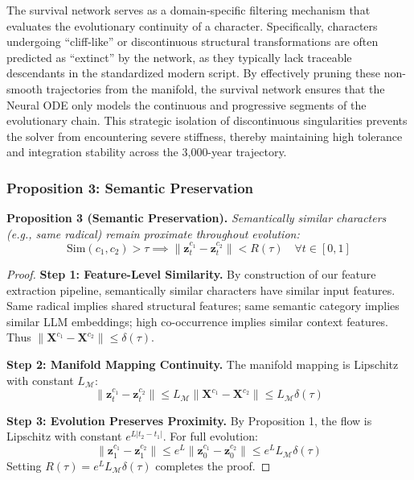 \documentclass{article}
\begin{document}
The survival network serves as a domain-specific filtering mechanism that evaluates the evolutionary continuity of a character. Specifically, characters undergoing ``cliff-like'' or discontinuous structural transformations are often predicted as ``extinct'' by the network, as they typically lack traceable descendants in the standardized modern script. By effectively pruning these non-smooth trajectories from the manifold, the survival network ensures that the Neural ODE only models the continuous and progressive segments of the evolutionary chain. This strategic isolation of discontinuous singularities prevents the solver from encountering severe stiffness, thereby maintaining high tolerance and integration stability across the 3,000-year trajectory.




\subsubsection{Proposition 3: Semantic Preservation}

\textbf{Proposition 3 (Semantic Preservation).} \textit{Semantically similar characters (e.g., same radical) remain proximate throughout evolution:}
\begin{equation}
\text{Sim}(c_1, c_2) > \tau \implies \|\mathbf{z}_t^{c_1} - \mathbf{z}_t^{c_2}\| < R(\tau) \quad \forall t \in [0, 1]
\end{equation}

\begin{proof}
\textbf{Step 1: Feature-Level Similarity.} By construction of our feature extraction pipeline, semantically similar characters have similar input features. Same radical implies shared structural features; same semantic category implies similar LLM embeddings; high co-occurrence implies similar context features. Thus $\|\mathbf{X}^{c_1} - \mathbf{X}^{c_2}\| \leq \delta(\tau)$.

\textbf{Step 2: Manifold Mapping Continuity.} The manifold mapping is Lipschitz with constant $L_{\mathcal{M}}$:
\begin{equation}
\|\mathbf{z}_t^{c_1} - \mathbf{z}_t^{c_2}\| \leq L_{\mathcal{M}} \|\mathbf{X}^{c_1} - \mathbf{X}^{c_2}\| \leq L_{\mathcal{M}} \delta(\tau)
\end{equation}

\textbf{Step 3: Evolution Preserves Proximity.} By Proposition 1, the flow is Lipschitz with constant $e^{L|t_2-t_1|}$. For full evolution:
\begin{equation}
\|\mathbf{z}_1^{c_1} - \mathbf{z}_1^{c_2}\| \leq e^L \|\mathbf{z}_0^{c_1} - \mathbf{z}_0^{c_2}\| \leq e^L L_{\mathcal{M}} \delta(\tau)
\end{equation}
Setting $R(\tau) = e^L L_{\mathcal{M}} \delta(\tau)$ completes the proof.
\end{proof}
\end{document}
